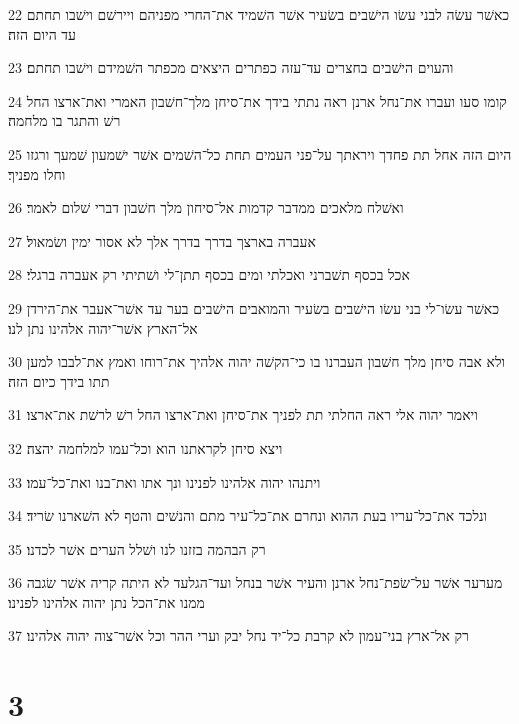 \par 22 כאשׁר עשׂה לבני עשׂו הישׁבים בשׂעיר אשׁר השׁמיד את־החרי מפניהם ויירשׁם וישׁבו תחתם עד היום הזה׃
\par 23 והעוים הישׁבים בחצרים עד־עזה כפתרים היצאים מכפתר השׁמידם וישׁבו תחתם׃
\par 24 קומו סעו ועברו את־נחל ארנן ראה נתתי בידך את־סיחן מלך־חשׁבון האמרי ואת־ארצו החל רשׁ והתגר בו מלחמה׃
\par 25 היום הזה אחל תת פחדך ויראתך על־פני העמים תחת כל־השׁמים אשׁר ישׁמעון שׁמעך ורגזו וחלו מפניך׃
\par 26 ואשׁלח מלאכים ממדבר קדמות אל־סיחון מלך חשׁבון דברי שׁלום לאמר׃
\par 27 אעברה בארצך בדרך בדרך אלך לא אסור ימין ושׂמאול׃
\par 28 אכל בכסף תשׁברני ואכלתי ומים בכסף תתן־לי ושׁתיתי רק אעברה ברגלי׃
\par 29 כאשׁר עשׂו־לי בני עשׂו הישׁבים בשׂעיר והמואבים הישׁבים בער עד אשׁר־אעבר את־הירדן אל־הארץ אשׁר־יהוה אלהינו נתן לנו׃
\par 30 ולא אבה סיחן מלך חשׁבון העברנו בו כי־הקשׁה יהוה אלהיך את־רוחו ואמץ את־לבבו למען תתו בידך כיום הזה׃
\par 31 ויאמר יהוה אלי ראה החלתי תת לפניך את־סיחן ואת־ארצו החל רשׁ לרשׁת את־ארצו׃
\par 32 ויצא סיחן לקראתנו הוא וכל־עמו למלחמה יהצה׃
\par 33 ויתנהו יהוה אלהינו לפנינו ונך אתו ואת־בנו ואת־כל־עמו׃
\par 34 ונלכד את־כל־עריו בעת ההוא ונחרם את־כל־עיר מתם והנשׁים והטף לא השׁארנו שׂריד׃
\par 35 רק הבהמה בזזנו לנו ושׁלל הערים אשׁר לכדנו׃
\par 36 מערער אשׁר על־שׂפת־נחל ארנן והעיר אשׁר בנחל ועד־הגלעד לא היתה קריה אשׁר שׂגבה ממנו את־הכל נתן יהוה אלהינו לפנינו׃
\par 37 רק אל־ארץ בני־עמון לא קרבת כל־יד נחל יבק וערי ההר וכל אשׁר־צוה יהוה אלהינו׃

\chapter{3}

